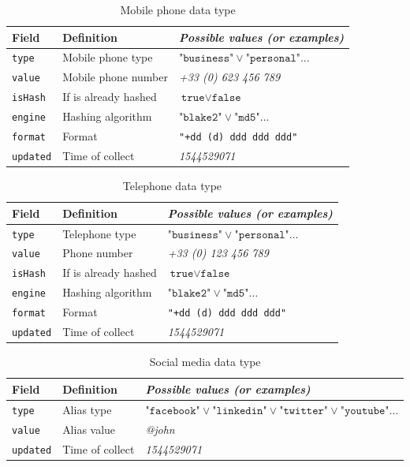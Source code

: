 \documentclass[twoside,twocolumn]{article}
\theoremstyle{definition}
\theoremstyle{remark}
\begin{document}
\begin{table}[htb]
    \centering
    \caption{Mobile phone data type}
    \begin{tabular*}{0.75\textwidth}{l|l||l}
        Field & Definition & \textit{Possible values (or examples)} \\
        \hline \hline
        \texttt{type} & Mobile phone type & $\texttt{"business"} \vee \texttt{"personal"} \dots$ \\
        \hline
        \texttt{value} & Mobile phone number & \textit{+33 (0) 623 456 789} \\
        \hline
        \texttt{isHash} & If is already hashed & $\texttt{true} \vee \texttt{false}$ \\
        \hline
        \texttt{engine} & Hashing algorithm & $\texttt{"blake2"} \vee \texttt{"md5"} \dots$ \\
        \hline
        \texttt{format} & Format & \texttt{"+dd (d) ddd ddd ddd"} \\
        \hline
        \texttt{updated} & Time of collect & \textit{1544529071}
        \label{table:mobiles}
    \end{tabular*}
\end{table}

\begin{table}[htb]
    \centering
    \caption{Telephone data type}
    \begin{tabular*}{0.75\textwidth}{l|l||l}
        Field & Definition & \textit{Possible values (or examples)} \\
        \hline \hline
        \texttt{type} & Telephone type & $\texttt{"business"} \vee \texttt{"personal"} \dots$ \\
        \hline
        \texttt{value} & Phone number & \textit{+33 (0) 123 456 789} \\
        \hline
        \texttt{isHash} & If is already hashed & $\texttt{true} \vee \texttt{false}$ \\
        \hline
        \texttt{engine} & Hashing algorithm & $\texttt{"blake2"} \vee \texttt{"md5"} \dots$ \\
        \hline
        \texttt{format} & Format & \texttt{"+dd (d) ddd ddd ddd"} \\
        \hline
        \texttt{updated} & Time of collect & \textit{1544529071}
        \label{table:phones}
    \end{tabular*}
\end{table}

\begin{table}[htb]
    \centering
    \caption{Social media data type}
    \begin{tabular*}{0.9\textwidth}{l|l||l}
        Field & Definition & \textit{Possible values (or examples)} \\
        \hline \hline
        \texttt{type} & Alias type & $\texttt{"facebook"} \vee \texttt{"linkedin"} \vee \texttt{"twitter"} \vee \texttt{"youtube"} \dots$ \\
        \hline
        \texttt{value} & Alias value & \textit{@john} \\
        \hline
        \texttt{updated} & Time of collect & \textit{1544529071}
        \label{table:socials}
    \end{tabular*}
\end{table}
\end{document}

